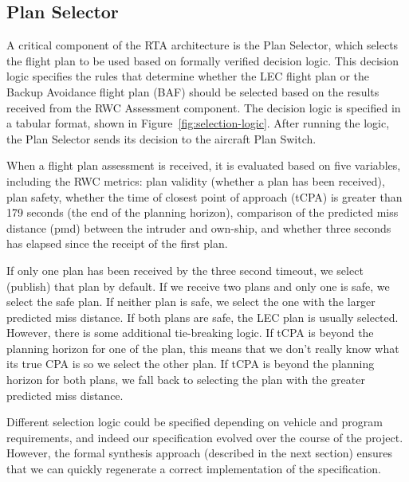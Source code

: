 \subsection{Plan Selector}




A critical component of the RTA architecture is the Plan Selector, which selects the flight
plan to be used based on formally verified decision logic. This decision logic specifies the rules
that determine whether the LEC flight plan or the Backup Avoidance flight plan (BAF) should
be selected based on the results received from the RWC Assessment component. The
decision logic is specified in a tabular format, shown in Figure~\ref{fig:selection-logic}.
After running the logic, the Plan Selector sends its decision to the
aircraft Plan Switch.

When a flight plan assessment is received, it is evaluated based on five
variables, including the RWC metrics:  plan validity (whether a plan has been received), plan
safety, whether the time of closest point of approach (tCPA) is greater than
179 seconds (the end of the planning horizon), comparison of the predicted miss
distance (pmd) between the intruder and own-ship, and whether three seconds has elapsed since the
receipt of the first plan.

If only one plan has been received by the three second timeout, we select (publish)
that plan by default.
If we receive two plans and only one is safe, we select the safe plan.
If neither plan is safe, we select the one with the larger predicted miss distance.
If both plans are safe, the LEC plan is usually selected.  However, there is some
additional tie-breaking logic.
If tCPA is beyond the planning horizon for one of the plan, this means that we don't really know what
its true CPA is so we select the other plan.
If tCPA is beyond the planning horizon for both plans, we fall back to selecting the plan with
the greater predicted miss distance.

Different selection logic could be specified depending on vehicle and program requirements,
and indeed our specification evolved over the course of the project.  However, the
formal synthesis approach (described in the next section) ensures that we can
quickly regenerate a correct implementation of the specification.

